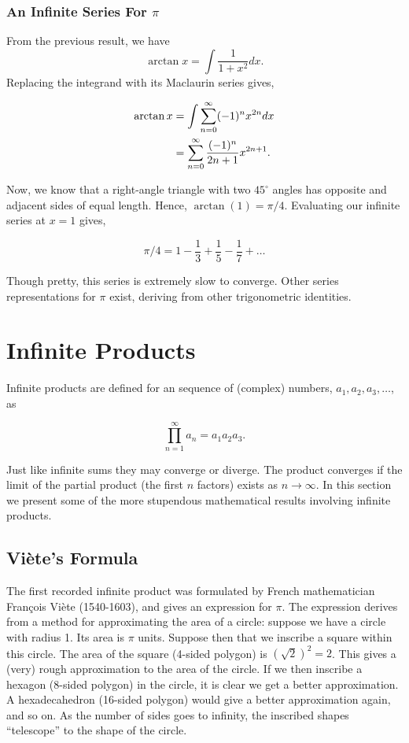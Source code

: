 \documentclass[11pt]{amsart}
\begin{document}
\subsubsection{An Infinite Series For $\pi$}

From the previous result, we have $$\arctan{x} = \int \frac{1}{1 + x^2} dx.$$ Replacing the integrand with its Maclaurin series gives,

\begin{align}
\arctan{x} &= \int \sum_{n=0}^{\infty} (-1)^nx^{2n} dx \notag \\
&= \sum_{n=0}^{\infty} \frac{(-1)^n}{2n + 1}x^{2n+1}. \notag
\end{align}

Now, we know that a right-angle triangle with two $45^{\circ}$ angles has opposite and adjacent sides of equal length. Hence, $\arctan({1}) = \pi/4$. Evaluating our infinite series at $x = 1$ gives,

$$\pi/4 = 1 - \frac{1}{3} + \frac{1}{5} - \frac{1}{7} + \dots$$

Though pretty, this series is extremely slow to converge. Other series representations for $\pi$ exist, deriving from other trigonometric identities.

\section{Infinite Products}

Infinite products are defined for an sequence of (complex) numbers, $a_1, a_2, a_3, \dots$, as

$$\prod_{n=1}^{\infty}a_n = a_1a_2a_3.$$

Just like infinite sums they may converge or diverge. The product converges if the limit of the partial product (the first $n$ factors) exists as $n \to \infty$. In this section we present some of the more stupendous mathematical results involving infinite products.

\subsection{Vi\`ete's Formula}

The first recorded infinite product was formulated by French mathematician Fran\c cois Vi\`ete (1540-1603), and gives an expression for $\pi$. The expression derives from a method for approximating the area of a circle: suppose we have a circle with radius 1. Its area is $\pi$ units. Suppose then that we inscribe a square within this circle. The area of the square (4-sided polygon) is $(\sqrt{2})^2 = 2$. This gives a (very) rough approximation to the area of the circle. If we then inscribe a hexagon (8-sided polygon) in the circle, it is clear we get a better approximation. A hexadecahedron (16-sided polygon) would give a better approximation again, and so on. As the number of sides goes to infinity, the inscribed shapes ``telescope'' to the shape of the circle.
\end{document}
